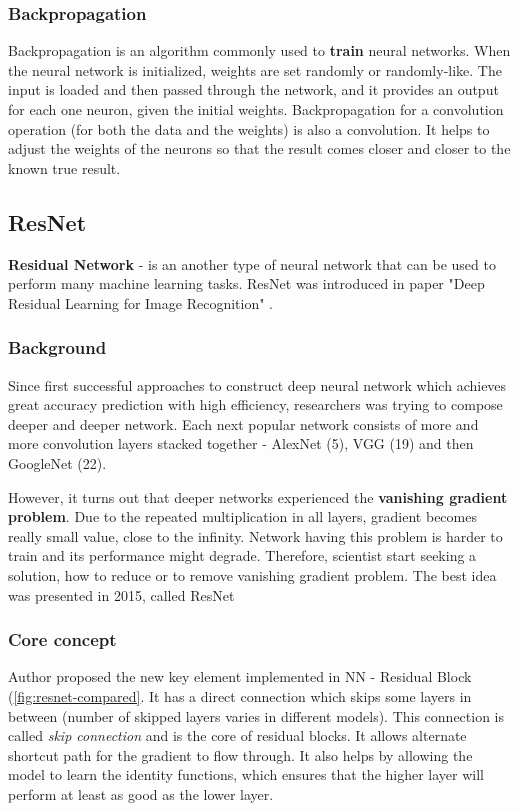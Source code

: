 \documentclass[../Main.tex]{subfiles}
\begin{document}
    \subsubsection{Backpropagation}
    Backpropagation is an algorithm commonly used to \textbf{train} neural networks. When the neural network is initialized, weights are set randomly or randomly-like. The input is loaded and then passed through the network, and it provides an output for each one neuron, given the initial weights. Backpropagation for a convolution operation (for both the data and the weights) is also a convolution. It helps to adjust the weights of the neurons so that the result comes closer and closer to the known true result. 


\subsection{ResNet}
    \textbf{Residual Network} - is an another type of neural network that can be used to perform many machine learning tasks. ResNet was introduced in paper "Deep Residual Learning for Image Recognition" \cite{ResNet2015}.
    
    \subsubsection{Background}
    Since first successful approaches to construct deep neural network which achieves great accuracy prediction with high efficiency, researchers was trying to compose deeper and deeper network. Each next popular network consists of more and more convolution layers stacked together - AlexNet (5), VGG (19) and then GoogleNet (22). \cite{tds-resnet}

    However, it turns out that deeper networks experienced the \textbf{vanishing gradient problem}. Due to the repeated multiplication in all layers, gradient becomes really small value, close to the infinity. Network having this problem is harder to train and its performance might degrade. Therefore, scientist start seeking a solution, how to reduce or to remove vanishing gradient problem. The best idea was presented in 2015, called ResNet \cite{ResNet2015}

    \subsubsection{Core concept}
    Author \cite{ResNet2015} proposed the new key element implemented in NN - Residual Block (\ref{fig:resnet-compared}. 
    It has a direct connection which skips some layers in between (number of skipped layers varies in different models). This connection is called \textit{skip connection} and is the core of residual blocks. It allows alternate shortcut path for the gradient to flow through. It also helps by allowing the model to learn the identity functions, which ensures that the higher layer will perform at least as good as the lower layer.
    
\end{document}
